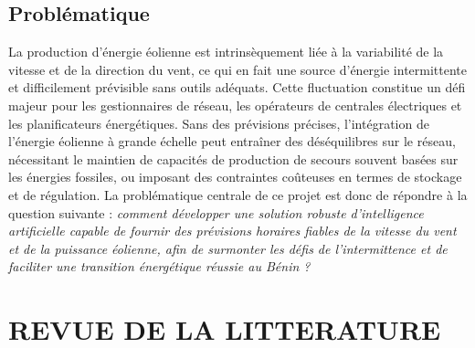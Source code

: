 \documentclass[12pt]{article}
\begin{document}
\subsection{Problématique}
La production d'énergie éolienne est intrinsèquement liée à la variabilité de la vitesse et de la direction du vent, ce qui en fait une source d'énergie intermittente et difficilement prévisible sans outils adéquats. Cette fluctuation constitue un défi majeur pour les gestionnaires de réseau, les opérateurs de centrales électriques et les planificateurs énergétiques. Sans des prévisions précises, l'intégration de l'énergie éolienne à grande échelle peut entraîner des déséquilibres sur le réseau, nécessitant le maintien de capacités de production de secours souvent basées sur les énergies fossiles, ou imposant des contraintes coûteuses en termes de stockage et de régulation. La problématique centrale de ce projet est donc de répondre à la question suivante : \textit{comment développer une solution robuste d'intelligence artificielle capable de fournir des prévisions horaires fiables de la vitesse du vent et de la puissance éolienne, afin de surmonter les défis de l'intermittence et de faciliter une transition énergétique réussie au Bénin ?}
\section{REVUE DE LA LITTERATURE}
\end{document}
